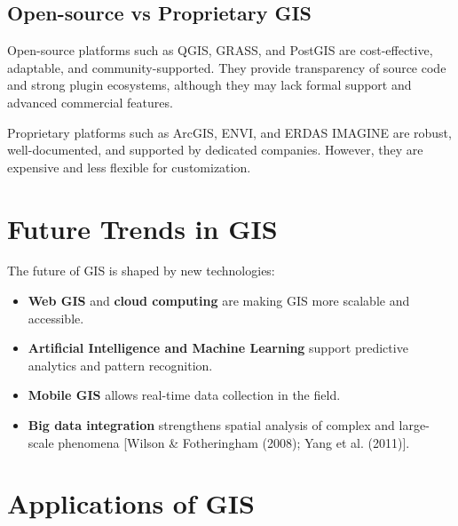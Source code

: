 \documentclass[
  11pt,
  letterpaper,
]{book}
\providecommand{\tightlist}{%
  \setlength{\itemsep}{0pt}\setlength{\parskip}{0pt}}
\begin{document}
\subsection{Open-source vs Proprietary
GIS}\label{open-source-vs-proprietary-gis}

Open-source platforms such as QGIS, GRASS, and PostGIS are
cost-effective, adaptable, and community-supported. They provide
transparency of source code and strong plugin ecosystems, although they
may lack formal support and advanced commercial features.

Proprietary platforms such as ArcGIS, ENVI, and ERDAS IMAGINE are
robust, well-documented, and supported by dedicated companies. However,
they are expensive and less flexible for customization.

\section{Future Trends in GIS}\label{future-trends-in-gis}

The future of GIS is shaped by new technologies:

\begin{itemize}
\tightlist
\item
  \textbf{Web GIS} and \textbf{cloud computing} are making GIS more
  scalable and accessible.
\item
  \textbf{Artificial Intelligence and Machine Learning} support
  predictive analytics and pattern recognition.
\item
  \textbf{Mobile GIS} allows real-time data collection in the field.
\item
  \textbf{Big data integration} strengthens spatial analysis of complex
  and large-scale phenomena {[}Wilson \& Fotheringham (2008); Yang et
  al. (2011){]}.
\end{itemize}

\section{Applications of GIS}\label{applications-of-gis}
\end{document}
